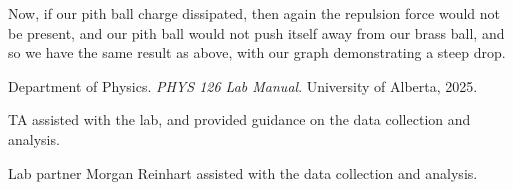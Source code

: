 \documentclass[12pt]{article}
\begin{document}
\noindent Now, if our pith ball charge dissipated, then again the repulsion force would not be present, and our pith ball would not push itself away from our brass ball,
and so we have the same result as above, with our graph demonstrating a steep drop.

\renewcommand{\refname}{References and Acknowledgements}
\begin{thebibliography}{9}
    Department of Physics. \textit{PHYS 126 Lab Manual}. University of Alberta, 2025.

    TA assisted with the lab, and provided guidance on the data collection and analysis.

    Lab partner Morgan Reinhart assisted with the data collection and analysis.
    
\end{thebibliography}
\end{document}
